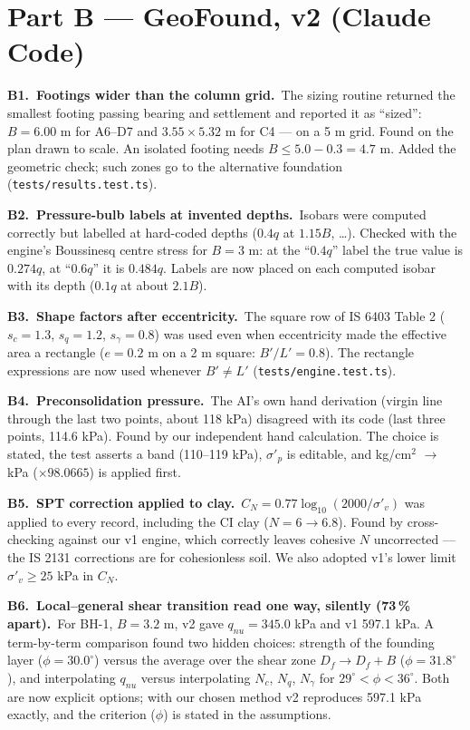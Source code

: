 \documentclass[11pt,a4paper]{article}
\newcommand{\code}[1]{\texttt{\small #1}}
\newcommand{\auditem}[3]{\par\medskip\textbf{\color{accent}#1.\ #2.}\ #3\par}
\begin{document}
\section{Part B --- GeoFound, v2 (Claude Code)}

\auditem{B1}{Footings wider than the column grid}{The sizing routine returned the smallest footing passing bearing and
settlement and reported it as ``sized'': $B = 6.00$ m for A6--D7 and $3.55 \times 5.32$ m for C4 --- on a 5 m grid.
Found on the plan drawn to scale. An isolated footing needs $B \le 5.0 - 0.3 = 4.7$ m. Added the geometric check; such
zones go to the alternative foundation (\code{tests/results.test.ts}).}

\auditem{B2}{Pressure-bulb labels at invented depths}{Isobars were computed correctly but labelled at hard-coded depths
($0.4q$ at $1.15B$, \ldots). Checked with the engine's Boussinesq centre stress for $B = 3$ m: at the ``$0.4q$'' label
the true value is $0.274q$, at ``$0.6q$'' it is $0.484q$. Labels are now placed on each computed isobar with its depth
($0.1q$ at about $2.1B$).}

\auditem{B3}{Shape factors after eccentricity}{The square row of IS 6403 Table 2 ($s_c = 1.3$, $s_q = 1.2$,
$s_\gamma = 0.8$) was used even when eccentricity made the effective area a rectangle ($e = 0.2$ m on a 2 m square:
$B'/L' = 0.8$). The rectangle expressions are now used whenever $B' \ne L'$ (\code{tests/engine.test.ts}).}

\auditem{B4}{Preconsolidation pressure}{The AI's own hand derivation (virgin line through the last two points, about
118 kPa) disagreed with its code (last three points, 114.6 kPa). Found by our independent hand calculation. The choice
is stated, the test asserts a band (110--119 kPa), $\sigma'_p$ is editable, and kg/cm$^2$ $\rightarrow$ kPa
($\times 98.0665$) is applied first.}

\auditem{B5}{SPT correction applied to clay}{$C_N = 0.77\log_{10}(2000/\sigma'_v)$ was applied to every record,
including the CI clay ($N = 6 \rightarrow 6.8$). Found by cross-checking against our v1 engine, which correctly leaves
cohesive $N$ uncorrected --- the IS 2131 corrections are for cohesionless soil. We also adopted v1's lower limit
$\sigma'_v \ge 25$ kPa in $C_N$.}

\auditem{B6}{Local--general shear transition read one way, silently (73\,\% apart)}{For BH-1, $B = 3.2$ m, v2 gave
$q_{nu} = 345.0$ kPa and v1 597.1 kPa. A term-by-term comparison found two hidden choices: strength of the founding
layer ($\phi = 30.0^\circ$) versus the average over the shear zone $D_f \rightarrow D_f + B$ ($\phi = 31.8^\circ$), and
interpolating $q_{nu}$ versus interpolating $N_c$, $N_q$, $N_\gamma$ for $29^\circ < \phi < 36^\circ$. Both are now
explicit options; with our chosen method v2 reproduces 597.1 kPa exactly, and the criterion ($\phi$) is stated in the
assumptions.}
\end{document}
